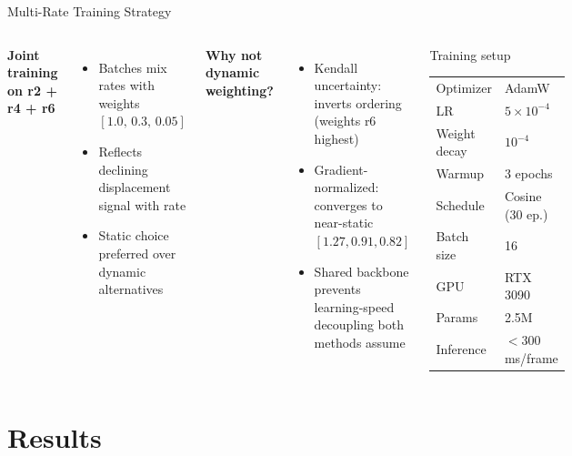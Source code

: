 \documentclass[aspectratio=169]{beamer}
\begin{document}
\begin{frame}{Multi-Rate Training Strategy}
  \begin{columns}[T]
    \textbf{Joint training on r2 + r4 + r6}
    \begin{itemize}
      \item Batches mix rates with weights $[1.0,\,0.3,\,0.05]$
      \item Reflects declining displacement signal with rate
      \item Static choice preferred over dynamic alternatives
    \end{itemize}

    \vspace{6pt}
    \textbf{Why not dynamic weighting?}
    \begin{itemize}
      \item Kendall uncertainty: inverts ordering (weights r6 highest)
      \item Gradient-normalized: converges to near-static $[1.27, 0.91, 0.82]$
      \item Shared backbone prevents learning-speed decoupling both methods assume
    \end{itemize}

    \begin{block}{Training setup}
      \small
      \begin{tabular}{ll}
        Optimizer   & AdamW \\
        LR          & $5\times10^{-4}$ \\
        Weight decay & $10^{-4}$ \\
        Warmup      & 3 epochs \\
        Schedule    & Cosine (30 ep.) \\
        Batch size  & 16 \\
        GPU         & RTX 3090 \\
        Params      & 2.5M \\
        Inference   & $<$300\,ms/frame \\
      \end{tabular}
    \end{block}
  \end{columns}
\end{frame}

\section{Results}
\end{document}
